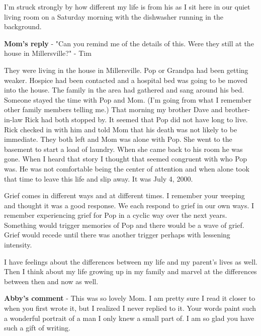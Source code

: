 I'm struck strongly by how different my life is from his as I sit here in our quiet living room on a Saturday morning with the dishwasher running in the background.

\textbf{Mom's reply} - "Can you remind me of the details of this.
Were they still at the house in Millersville?" - Tim

They were living in the house in Millersville.
Pop or Grandpa had been getting weaker.
Hospice had been contacted and a hospital bed was going to be moved into the house.
The family in the area had gathered and sang around his bed.
Someone stayed the time with Pop and Mom.
(I'm going from what I remember other family members telling me.) That morning my brother Dave and brother-in-law Rick had both stopped by.
It seemed that Pop did not have long to live.
Rick checked in with him and told Mom that his death was not likely to be immediate.
They both left and Mom was alone with Pop.
She went to the basement to start a load of laundry.
When she came back to his room he was gone.
When I heard that story I thought that seemed congruent with who Pop was.
He was not comfortable being the center of attention and when alone took that time to leave this life and slip away.
It was July 4, 2000.

Grief comes in different ways and at different times.
I remember your weeping and thought it was a good response.
We each respond to grief in our own ways.
I remember experiencing grief for Pop in a cyclic way over the next years.
Something would trigger memories of Pop and there would be a wave of grief.
Grief would recede until there was another trigger perhaps with lessening intensity.


I have feelings about the differences between my life and my parent's lives as well.
Then I think about my life growing up in my family and marvel at the differences between then and now as well.


\textbf{Abby's comment} - This was so lovely Mom.
I am pretty sure I read it closer to when you first wrote it, but I realized I never replied to it.
Your words paint such a wonderful portrait of a man I only knew a small part of.
I am so glad you have such a gift of writing.

